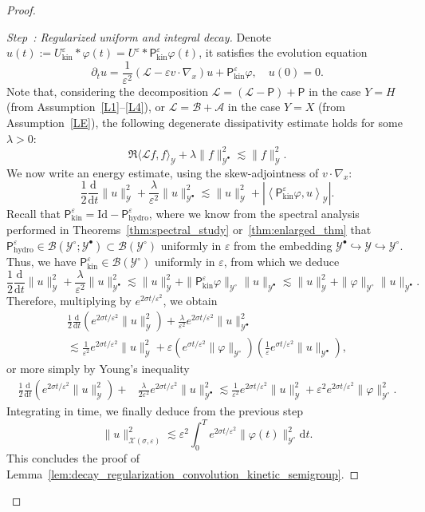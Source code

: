 \documentclass[10pt]{amsart}
\theoremstyle{definition}\newtheorem{defi}[theo]{Definition}\newtheorem{rema}[theo]{Remark}\newtheorem{exam}[theo]{Example}\newtheorem{exem}[theo]{Example}\newtheorem{nota}[theo]{Notation}
\newcommand{\hyd}{\mathrm{hydro}}
\newcommand{\kin}{\mathrm{kin}}
\newcommand{\Id}{\mathrm{Id}}
\renewcommand{\d}{\mathrm{d}}
\renewcommand{\AA}{\mathcal{A}}
\newcommand{\BB}{\mathcal{B}}
\newcommand{\LL}{\mathcal{L}}
\newcommand{\PP}{\mathsf{P}}
\newcommand{\VV}{\mathcal{Y}}
\newcommand{\BBB}{\mathscr{B}}
\newcommand{\GGG}{\mathscr{X}}
\newcommand{\Ss}{H}
\newcommand{\Sl}{X}
\newcommand{\SSSl}{\GGG}
\newcommand{\Sg}{Y}
\newcommand{\SSg}{\VV}
\newcommand{\SSgp}{\VV^{\bullet}}
\newcommand{\SSgm}{\VV^{\circ}}
\newcommand*\eps{{\varepsilon}}
\newcommand{\la}{\langle}
\newcommand{\ra}{\rangle}
\newcommand{\lla}{\left\langle}
\newcommand{\rra}{\right\rangle}
\newcounter{stepcount}
\newenvironment{step}[1]{\refstepcounter{stepcount}\begin{proof}[Step~\thestepcount: #1]}{\let\qed\relax\end{proof}}
\begin{document}
\begin{proof}
\begin{step}{{Regularized uniform and integral decay}}\label{prflemm4.9step2}
Denote $u(t) := U^\eps_\kin * \varphi(t) = U^\eps * \PP^\eps_\kin \varphi(t)$, it satisfies the evolution equation
\[
\partial_t u = \frac{1}{\eps^2} \left(\LL - \eps v \cdot \nabla_x \right) u + \PP^\eps_\kin \varphi, \quad u(0) = 0.
\]
Note that, considering the decomposition $\LL = (\LL - \PP) + \PP$ in the case $\Sg = \Ss$ (from Assumption~\eqref{L1}--\eqref{L4}), or $\LL = \BB+ \AA$ in the case $\Sg = \Sl$ (from Assumption~\eqref{LE}), the following degenerate dissipativity estimate holds for some $\lambda > 0$:
\[
\Re \la \LL f, f \ra_\SSg + \lambda \| f \|_{\SSgp}^2 \lesssim \| f \|^2_\SSg.
\]
We now write an energy estimate, using the skew-adjointness of $v \cdot \nabla_{x}$:
\[
\frac{1}{2} \frac{\d}{\d t} \| u \|^2_{\SSg} + \frac{\lambda}{\eps^2} \| u \|_{\SSgp}^2 \lesssim \| u \|^2_{\SSg} + \left| \lla \PP^\eps_\kin \varphi, u \rra_\SSg \right|.
\]
Recall that $\PP^\eps_\kin = \Id - \PP^\eps_\hyd$, where we know from the spectral analysis performed in Theorems~\ref{thm:spectral_study} or~\ref{thm:enlarged_thm} that $\PP^\eps_\hyd \in \BBB(\SSgm ; \SSgp) \subset \BBB(\SSgm)$ uniformly in $\eps$ from the embedding $\SSgp \hookrightarrow \SSg \hookrightarrow \SSgm$. Thus, we have $\PP^\eps_\kin \in \BBB(\SSgm)$ uniformly in $\eps$, from which we deduce
\[
\frac{1}{2} \frac{\d}{\d t} \| u \|^2_{\SSg} + \frac{\lambda}{\eps^2} \| u \|_{\SSgp}^2 \lesssim \| u \|^2_{\SSg} + \| \PP^\eps_\kin \varphi \|_{\SSgm} \| u \|_{\SSgp} \lesssim \| u \|^2_{\SSg} + \| \varphi \|_{\SSgm} \| u \|_{\SSgp}.
\]
Therefore, multiplying by $e^{2\sigma t / \eps^2}$, we obtain
\begin{multline*}
\frac{1}{2} \frac{\d}{\d t} \left(e^{2 \sigma t / \eps^2} \| u \|^2_{\SSg}\right) +  \frac{\lambda}{\eps^2} e^{2 \sigma t / \eps^2} \| u \|_{\SSgp}^2 \\
 \lesssim \frac{1}{\eps^2} e^{2 \sigma t / \eps^2} \| u \|^2_{\SSg} + \eps \left(e^{\sigma t / \eps^2} \| \varphi \|_{\SSgm}\right) \left(\frac{1}{\eps} e^{\sigma t / \eps^2} \| u \|_{\SSgp}\right),
\end{multline*}
or more simply by Young's inequality
\begin{align*}
\frac{1}{2} \frac{\d}{\d t} \left(e^{2 \sigma t / \eps^2} \| u \|^2_{\SSg}\right) + & \frac{\lambda}{2 \eps^2} e^{2 \sigma t / \eps^2} \| u \|_{\SSgp}^2
\lesssim \frac{1}{\eps^2} e^{2 \sigma t / \eps^2} \| u \|^2_{\SSg} + \eps^2 e^{2 \sigma t / \eps^2} \| \varphi \|_{\SSgm}^2.
\end{align*}
Integrating in time, we finally deduce from the previous step
\[
\| u \|^2_{\SSSl(\sigma, \eps)} \lesssim \eps^2 \int_0^T e^{2 \sigma t / \eps^2} \| \varphi(t) \|_{\SSgm}^2\d t.
\]
This concludes the proof of Lemma~\ref{lem:decay_regularization_convolution_kinetic_semigroup}.\qedhere
\end{step}\let\qed\relax
\end{proof}
\end{document}
